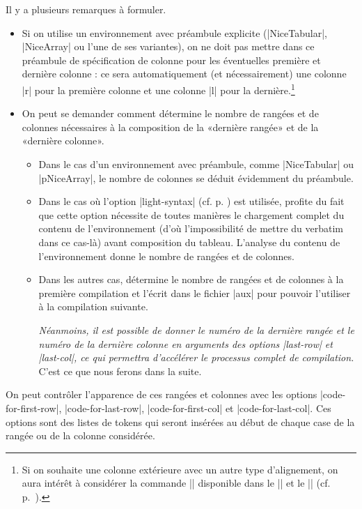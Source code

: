 \documentclass[dvipsnames]{article}%
\begin{document}
\medskip
Il y a plusieurs remarques à formuler.
%
\begin{itemize}[beginpenalty=10000]
\item Si on utilise un environnement avec préambule explicite (|{NiceTabular}|,
|{NiceArray}| ou l'une de ses variantes), on ne doit pas mettre dans ce
préambule de spécification de colonne pour les éventuelles première et dernière
colonne : ce sera automatiquement (et nécessairement) une colonne |r| pour la
première colonne et une colonne |l| pour la dernière.\footnote{Si on souhaite
  une colonne extérieure avec un autre type d'alignement, on aura intérêt à
  considérer la commande |\SubMatrix| disponible dans le |\CodeAfter| et le
  |\CodeBefore| (cf. p.~\pageref{sub-matrix}).}

\item On peut se demander comment  détermine le nombre de rangées et de colonnes nécessaires à la
composition de la «dernière rangée» et de la «dernière colonne».

\begin{itemize}
\item Dans le cas d'un environnement avec préambule, comme |{NiceTabular}| ou
|{pNiceArray}|, le nombre de colonnes se déduit évidemment du préambule.

\item Dans le cas où l'option |light-syntax| (cf. p. \pageref{light-syntax}) est
utilisée,  profite du fait que cette option nécessite de toutes
manières le chargement complet du contenu de l'environnement (d'où
l'impossibilité de mettre du verbatim dans ce cas-là) avant composition du
tableau. L'analyse du contenu de l'environnement donne le nombre de rangées
et de colonnes.

\item Dans les autres cas,  détermine le nombre de rangées et de
colonnes à la première compilation et l'écrit dans le fichier |aux| pour
pouvoir l'utiliser à la compilation suivante.

\textsl{Néanmoins, il est possible de donner le numéro de la dernière rangée et
  le numéro de la dernière colonne en arguments des options |last-row| et
  |last-col|, ce qui permettra d'accélérer le processus complet de compilation.}
C'est ce que nous ferons dans la suite.
\end{itemize}

\end{itemize}

\medskip
{}
On peut contrôler l'apparence de ces rangées et colonnes avec les options
|code-for-first-row|, |code-for-last-row|, |code-for-first-col| et
|code-for-last-col|. Ces options sont des listes de tokens qui seront insérées
au début de chaque case de la rangée ou de la colonne considérée.
\end{document}
